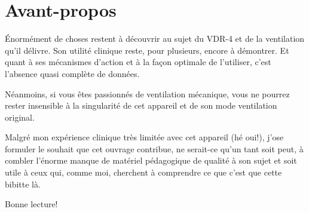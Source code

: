 \chapter*{Avant-propos}

Énormément de choses restent à découvrir au sujet du VDR-4 et de la
ventilation qu'il délivre. Son utilité clinique reste, pour plusieurs,
encore à démontrer.  Et quant à ses mécanismes d'action et à la façon
optimale de l'utiliser, c'est l'absence quasi complète de données.

Néanmoins, si vous êtes passionnés de ventilation mécanique, vous ne
pourrez rester insensible à la singularité de cet appareil et de son
mode ventilation original.

Malgré mon expérience clinique très limitée avec cet appareil (hé
oui!), j'ose formuler le souhait que cet ouvrage contribue, ne
serait-ce qu'un tant soit peut, à combler l'énorme manque de matériel
pédagogique de qualité à son sujet et soit utile à ceux qui, comme
moi, cherchent à comprendre ce que c'est que cette bibitte là.

Bonne lecture!
